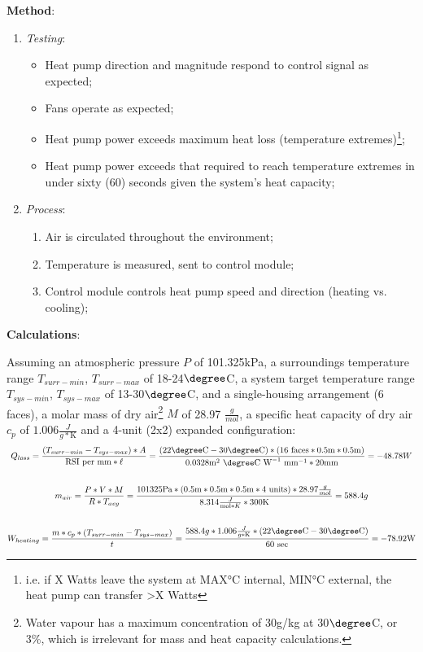 \documentclass{report}
\begin{document}
\textbf{Method}:
\begin{enumerate}
    \item \textit{Testing}:
    \begin{itemize}
        \item Heat pump direction and magnitude respond to control signal as expected;
        \item Fans operate as expected;
        \item Heat pump power exceeds maximum heat loss (temperature extremes)\footnote{i.e. if X Watts leave the system at MAX°C internal, MIN°C external, the heat pump can transfer >X Watts};
        \item Heat pump power exceeds that required to reach temperature extremes in under sixty (60) seconds given the system's heat capacity;
    \end{itemize}
    \item \textit{Process}:
    \begin{enumerate}
        \item Air is circulated throughout the environment;
        \item Temperature is measured, sent to control module;
        \item Control module controls heat pump speed and direction (heating vs. cooling);
    \end{enumerate}
\end{enumerate}

\textbf{Calculations}:

Assuming an atmospheric pressure $P$ of 101.325kPa, a surroundings temperature range $T_{surr-min}$, $T_{surr-max}$ of 18-24$\degree$C, a system target temperature range $T_{sys-min}$, $T_{sys-max}$ of 13-30$\degree$C, and a single-housing arrangement (6 faces), a molar mass of dry air\footnote{Water vapour has a maximum concentration of 30g/kg at 30$\degree$C, or 3\%, which is irrelevant for mass and heat capacity calculations.} $M$ of 28.97 $\frac g{mol}$, a specific heat capacity of dry air $c_p$ of $1.006 \frac{J}{g*\text{K}}$ and a 4-unit (2x2) expanded configuration:\\
\vspace{.05cm}
\begin{gather*}
    \label{eqn:heatloss}
    Q_{loss}=\frac{(T_{surr-min}-T_{sys-max}) * A}{\text{RSI per mm} * \ell}=\frac{(22\degree \text{C}-30\degree \text{C}) * (16 \text{ faces} * 0.5\text{m} * 0.5\text{m})}{0.0328 \text{m}^2~  \degree \text{C}~\text{W}^{-1}~\text{mm}^{-1} * 20 \text{mm}}=-48.78 W\\\vspace{.05cm}\\
    \label{eqn:airmass}
    m_{air}=\frac{P*V*M}{R*T_{avg}}=\frac{101325\text{Pa}*(0.5\text{m}*0.5\text{m}*0.5\text{m}*4\text{ units})*28.97\frac g{mol}}{8.314\frac{J}{\text{mol}*K}*300\text{K}}=588.4g\\\vspace{.05cm}\\
    \label{eqn:heatcapacity}
    W_{heating}=\frac{m*c_p*(T_{surr-min}-T_{sys-max})}{t}=\frac{588.4g*1.006\frac{J}{g*\text{K}}*(22\degree \text{C}-30\degree \text{C})}{60\text{ sec}}=-78.92\text{W}
\end{gather*}
\end{document}
